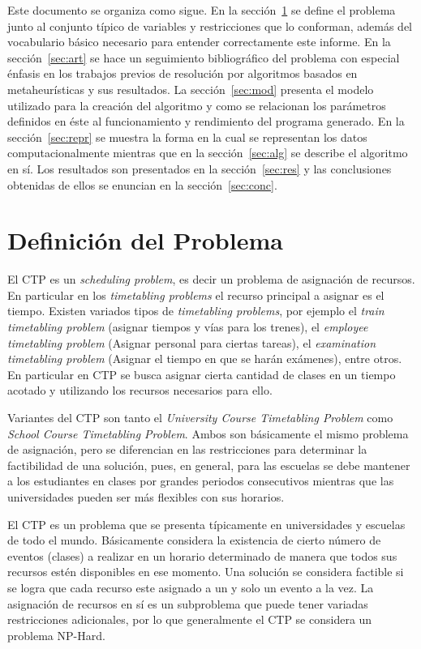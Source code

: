 \documentclass[letter, 10pt]{article}
\begin{document}
Este documento se organiza como sigue. En la sección~\ref{sec:def} se define el
problema junto al conjunto típico de variables y restricciones que lo conforman,
además del vocabulario básico necesario para entender correctamente este
informe. 
En la sección~\ref{sec:art} se hace un seguimiento bibliográfico del problema
con especial énfasis en los trabajos previos de resolución por algoritmos
basados en metaheurísticas y sus resultados.
La sección~\ref{sec:mod} presenta el modelo utilizado para la creación del
algoritmo y como se relacionan los parámetros definidos en éste al
funcionamiento y rendimiento del programa generado.
En la sección~\ref{sec:repr} se muestra la forma en la cual se representan
los datos computacionalmente mientras que en la sección~\ref{sec:alg} se
describe el algoritmo en sí.
Los resultados son presentados en la sección~\ref{sec:res} y las conclusiones
obtenidas de ellos se enuncian en la sección~\ref{sec:conc}.

\section{Definición del Problema}\label{sec:def}
El CTP es un \emph{scheduling problem}, es decir un problema de asignación de
recursos.
En particular en los \emph{timetabling problems} el recurso principal a asignar
es el tiempo. 
Existen variados tipos de \emph{timetabling problems}, por ejemplo el
\emph{train timetabling problem}\cite{caprara2002modeling,khan2010stochastic}
(asignar tiempos y vías para los trenes), el \emph{employee timetabling
problem}\cite{detienne2009cut,cowling2000hyperheuristic} (Asignar personal para 
ciertas tareas), el \emph{examination timetabling problem}\cite{di2000tabu}
(Asignar el tiempo en que se harán exámenes), entre otros.
En particular en CTP se busca asignar cierta cantidad de clases en un tiempo
acotado y utilizando los recursos necesarios para ello.

Variantes del CTP son tanto  el \emph{University Course Timetabling  Problem}
como \emph{School Course Timetabling Problem}. Ambos son básicamente el
mismo problema de asignación, pero se diferencian en las restricciones para
determinar la factibilidad de una solución, pues, en general, para las escuelas
se debe mantener a los estudiantes en clases por grandes periodos consecutivos
mientras que las universidades pueden ser más flexibles con sus horarios.

El CTP es un problema que se presenta típicamente en universidades y escuelas
de todo el mundo. Básicamente considera la existencia de cierto número de
eventos (clases) a realizar en un horario determinado de manera que todos sus
recursos estén disponibles en ese momento.
Una solución se considera factible si se logra que cada recurso este asignado
a un y solo un evento a la vez. La asignación de recursos en sí es un
subproblema que puede tener variadas restricciones adicionales, por lo que
generalmente el CTP se considera un problema NP-Hard.
\end{document}
